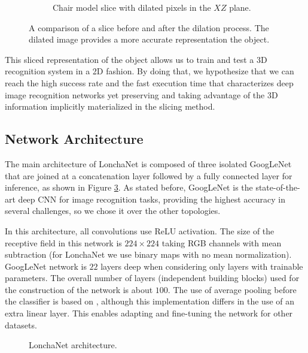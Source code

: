 \begin{figure}[!t]
\begin{subfigure}[t]{0.35\linewidth}
        \caption{Chair model slice with dilated pixels in the $XZ$ plane.}
        \label{fig:dilation_b}
    \end{subfigure}
    \caption{A comparison of a slice before and after the dilation process. The dilated image provides a more accurate representation the object.}
    \label{fig:objrecog:dilation}
\end{figure}

This sliced representation of the object allows us to train and test a \acs{3D} recognition system in a \acs{2D} fashion. By doing that, we hypothesize that we can reach the high success rate and the fast execution time that characterizes deep image recognition networks yet preserving and taking advantage of the \acs{3D} information implicitly materialized in the slicing method.

\subsection{Network Architecture}
\label{cha:objrecog:sec:lonchanet:subsec:architecture}

The main architecture of LonchaNet is composed of three isolated GoogLeNet that are joined at a concatenation layer followed by a fully connected layer for inference, as shown in Figure \ref{fig:objrecog:3dslicelenet}. As stated before, GoogLeNet \cite{Szegedy2015} is the state-of-the-art deep \acl{CNN} for image recognition tasks, providing the highest accuracy in several challenges, so we chose it over the other topologies.

In this architecture, all convolutions use \ac{ReLU} activation. The size of the receptive field in this network is $224 \times 224$ taking RGB  channels with mean subtraction (for LonchaNet we use binary maps with no mean normalization). GoogLeNet network is $22$ layers deep when considering only layers with trainable parameters. The overall number of layers (independent building blocks) used for the construction of the network is about $100$. The use of average pooling before the classifier is based on \cite{Lin2013}, although this implementation differs in the use of an extra linear layer. This enables adapting and fine-tuning the network for other datasets.

\begin{figure}[!b]
    \centering
    \resizebox{\linewidth}{!}{}
    \caption{LonchaNet architecture.}
    \label{fig:objrecog:3dslicelenet}
\end{figure}


